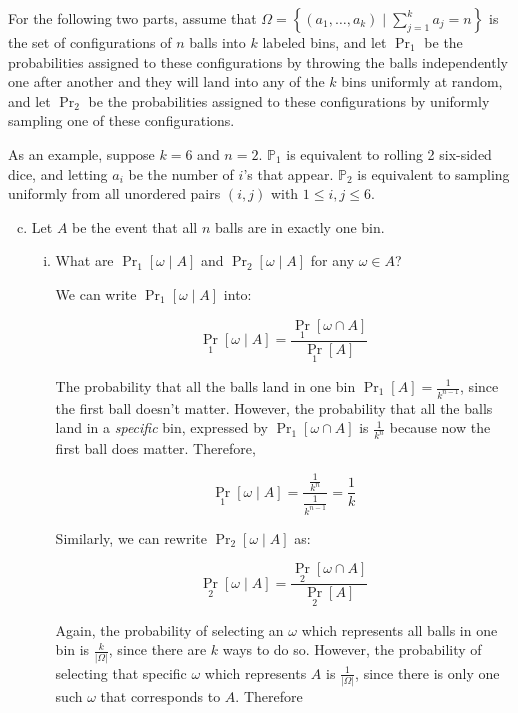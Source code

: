 \documentclass[11pt]{article}
\begin{document}
For the following two parts, assume that $\Omega = \left\{(a_1, \dots, a_k) \mid \sum_{j=1}^k a_j = n\right\}$ is the set of configurations of $n$ balls into $k$ labeled bins, and let $\Pr_1$ be the probabilities assigned to these configurations by throwing the balls independently one after another and they will land into any of the $k$ bins uniformly at random, and let $\Pr_2$ be the probabilities assigned to these configurations by uniformly sampling one of these configurations.

As an example, suppose $k = 6$ and $n = 2$. $\mathbb{P}_1$ is equivalent to rolling 2 six-sided dice, and letting $a_i$ be the number of $i$'s that appear. $\mathbb{P}_2$ is equivalent to sampling uniformly from all unordered pairs $(i, j)$ with $1 \leq i, j \leq 6$. 

\begin{enumerate}[(a)]
    \setcounter{enumi}{2}
    \item Let $A$ be the event that all $n$ balls are in exactly one bin. 

        \begin{enumerate}[(i)]
            \item What are $\Pr_1\left[ \omega \mid A \right]$ and $\Pr_2\left[ \omega \mid A \right]$ for any $\omega\in A$? 

            \begin{solution}
                We can write $\Pr_1[\omega \mid A]$ into: 

                \[ \Pr_1[\omega \mid A] = \frac{\Pr_1[\omega \cap A]}{\Pr_1[A]}\]

                The probability that all the balls land in one bin $\Pr_1[A] = \frac{1}{k^{n-1}}$, since the first ball doesn't matter. However, the probability that all the balls land in a \textit{specific} bin, expressed by $\Pr_1[\omega \cap A]$ is $\frac{1}{k^n}$ because now the first ball does matter. Therefore, 

                \[ \Pr_1[\omega \mid A] = \frac{\frac{1}{k^n}}{\frac{1}{k^{n-1}}} = \frac{1}{k}\] 

                Similarly, we can rewrite $\Pr_2[\omega \mid A]$ as: 

                \[ \Pr_2[\omega \mid A] = \frac{\Pr_2[\omega \cap A]}{\Pr_2[A]}\]

                Again, the probability of selecting an $\omega$ which represents all balls in one bin is $\frac{k}{|\Omega|}$, since there are $k$ ways to do so. However, the probability of selecting that specific $\omega$ which represents $A$ is $\frac{1}{|\Omega|}$, since there is only one such $\omega$ that corresponds to $A$. Therefore 


\end{solution}
\end{enumerate}
\end{enumerate}
\end{document}
